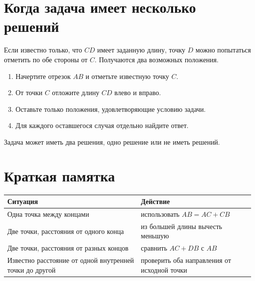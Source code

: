 \section{Когда задача имеет несколько решений}

\twopositionsfigure

Если известно только, что \(CD\) имеет заданную длину, точку \(D\) можно
попытаться отметить по обе стороны от \(C\). Получаются два возможных
положения.

\candidatefilterfigure

\begin{propertybox}
  \begin{enumerate}
    \item Начертите отрезок \(AB\) и отметьте известную точку \(C\).
    \item От точки \(C\) отложите длину \(CD\) влево и вправо.
    \item Оставьте только положения, удовлетворяющие условию задачи.
    \item Для каждого оставшегося случая отдельно найдите ответ.
  \end{enumerate}
\end{propertybox}

Задача может иметь два решения, одно решение или не иметь решений.

\section{Краткая памятка}

\begin{center}
  \renewcommand{\arraystretch}{1.38}
  \begin{tabularx}{\textwidth}{
    >{\raggedright\arraybackslash}p{}
    >{\raggedright\arraybackslash}X}
    \toprule
    \rowcolor{TableHeader}
    Ситуация & Действие \\
    \midrule
    Одна точка между концами
      & использовать \(AB=AC+CB\) \\
    \addlinespace[0.2em]
    Две точки, расстояния от одного конца
      & из большей длины вычесть меньшую \\
    \addlinespace[0.2em]
    Две точки, расстояния от разных концов
      & сравнить \(AC+DB\) с \(AB\) \\
    \addlinespace[0.2em]
    Известно расстояние от одной внутренней точки до другой
      & проверить оба направления от исходной точки \\
    \bottomrule
  \end{tabularx}
\end{center}

